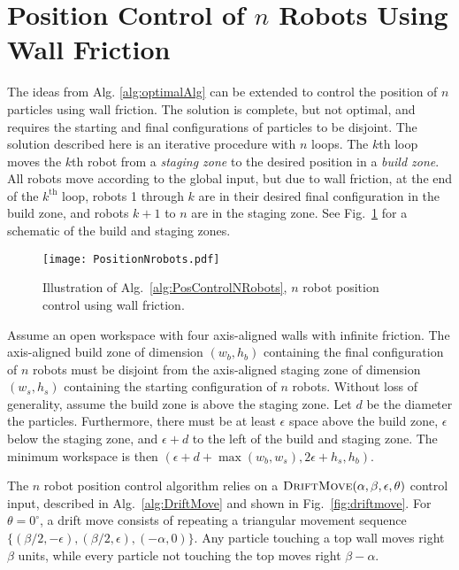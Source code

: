 

\section{Position Control of $n$ Robots Using Wall Friction}\label{sec:PostionControlnRobots}
The ideas from Alg. \ref{alg:optimalAlg}  can be extended to control the position of $n$ particles using wall friction.
The solution is complete, but not optimal, and requires the starting and final configurations of particles to be disjoint.
The solution described here is an iterative procedure with $n$ loops. 
 The $k$th loop moves the $k$th robot from a \emph{staging zone} to the desired position in a \emph{build zone}. 
  All robots move according to the global input, but due to wall friction, at the end of the $k^{\text{th}}$ loop, robots 1 through $k$ are in their desired final configuration in the build zone, and robots $k+1$ to $n$ are in the staging zone. 
   See Fig.~\ref{fig:simulationNrobot} for a schematic of the build and staging zones.

\begin{figure}
\begin{center}
	\texttt{[image: PositionNrobots.pdf]}
\end{center}
\vspace{-1em}
\caption{\label{fig:simulationNrobot}
Illustration of Alg.\ \ref{alg:PosControlNRobots}, $n$ robot position control  using wall friction.
}
\end{figure}

Assume an open workspace with four axis-aligned walls with infinite friction.
The axis-aligned build zone of dimension $(w_b, h_b)$ containing the final configuration of $n$ robots must be disjoint from the axis-aligned staging zone of dimension $(w_s, h_s)$  containing the starting configuration of $n$ robots.
 Without loss of generality, assume the build zone  is above the staging zone.  Let $d$ be the diameter the particles.
Furthermore, there must be at least $\epsilon$ space above the build zone, $\epsilon$ below the staging zone, and $\epsilon + d$ to the left of the build and staging zone.  The minimum workspace is then $(\epsilon + d + \max(w_b,w_s), 2\epsilon + h_s,h_b)$.

The $n$ robot position control algorithm relies on a $\text{\sc DriftMove}(\alpha, \beta, \epsilon,\theta)$ control input, described in Alg.~\ref{alg:DriftMove} and shown in Fig.\  \ref{fig:driftmove}.
For $\theta = 0^\circ$, a drift move consists of repeating a triangular movement sequence $\{ (\beta/2,-\epsilon),(\beta/2,\epsilon),(-\alpha,0)\}$. 
 Any particle touching a top wall moves right $\beta$ units, while every particle not touching the top moves right $\beta-\alpha$.

